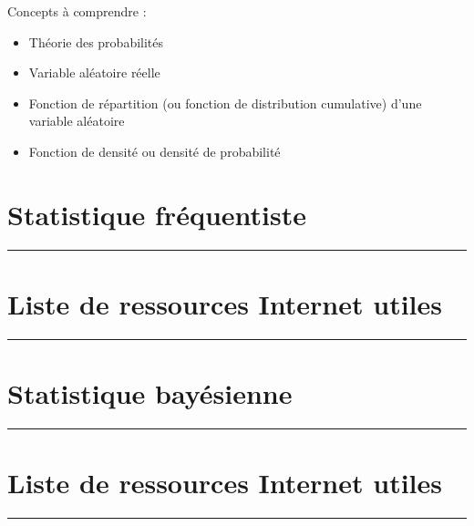 \documentclass[
]{book}
\providecommand{\tightlist}{%
  \setlength{\itemsep}{0pt}\setlength{\parskip}{0pt}}
\begin{document}
Concepts à comprendre :

\begin{itemize}
\tightlist
\item
  Théorie des probabilités
\item
  Variable aléatoire réelle
\item
  Fonction de répartition (ou fonction de distribution cumulative) d'une
  variable aléatoire
\item
  Fonction de densité ou densité de probabilité
\end{itemize}

\hypertarget{frequentiste}{%
\section{Statistique fréquentiste}\label{frequentiste}}

\begin{center}\rule{0.5\linewidth}{0.5pt}\end{center}

\hypertarget{ref-stat-freq}{%
\section*{Liste de ressources Internet utiles}\label{ref-stat-freq}}

\begin{center}\rule{0.5\linewidth}{0.5pt}\end{center}

\hypertarget{bayesienne}{%
\section{Statistique bayésienne}\label{bayesienne}}

\begin{center}\rule{0.5\linewidth}{0.5pt}\end{center}

\hypertarget{ref-stat-bayes}{%
\section*{Liste de ressources Internet utiles}\label{ref-stat-bayes}}

\begin{center}\rule{0.5\linewidth}{0.5pt}\end{center}
\end{document}

